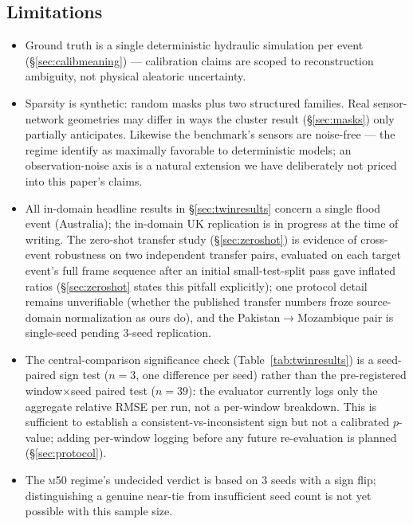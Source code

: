 \documentclass[11pt]{article}
\newcommand{\mfifty}{\textsc{m50}}
\begin{document}
\subsection{Limitations}
\label{sec:limitations}
\begin{itemize}
  \item Ground truth is a single deterministic hydraulic simulation per
    event (\S\ref{sec:calibmeaning}) --- calibration claims are scoped to
    reconstruction ambiguity, not physical aleatoric uncertainty.
  \item Sparsity is synthetic: random masks plus two structured families.
    Real sensor-network geometries may differ in ways the cluster result
    (\S\ref{sec:masks}) only partially anticipates. Likewise the
    benchmark's sensors are noise-free --- the regime
    \citet{spatiallyawarediffusion2024} identify as maximally favorable
    to deterministic models; an observation-noise axis is a natural
    extension we have deliberately not priced into this paper's claims.
  \item All in-domain headline results in \S\ref{sec:twinresults} concern
    a single flood event (Australia); the in-domain UK replication is
    in progress at the time of writing. The zero-shot transfer study
    (\S\ref{sec:zeroshot}) is evidence of cross-event robustness on two
    independent transfer pairs, evaluated on each target event's full
    frame sequence after an initial small-test-split pass gave inflated
    ratios (\S\ref{sec:zeroshot} states this pitfall explicitly); one
    protocol detail remains unverifiable (whether the published transfer
    numbers froze source-domain normalization as ours do), and the
    Pakistan$\to$Mozambique pair is single-seed pending 3-seed
    replication.
  \item The central-comparison significance check (Table~\ref{tab:twinresults})
    is a seed-paired sign test ($n{=}3$, one difference per seed) rather
    than the pre-registered window$\times$seed paired test ($n{=}39$):
    the evaluator currently logs only the aggregate relative RMSE per
    run, not a per-window breakdown. This is sufficient to establish a
    consistent-vs-inconsistent sign but not a calibrated $p$-value; adding
    per-window logging before any future re-evaluation is planned
    (\S\ref{sec:protocol}).
  \item The \mfifty{} regime's undecided verdict is based on 3 seeds
    with a sign flip; distinguishing a genuine near-tie from insufficient
    seed count is not yet possible with this sample size.

\end{itemize}
\end{document}
